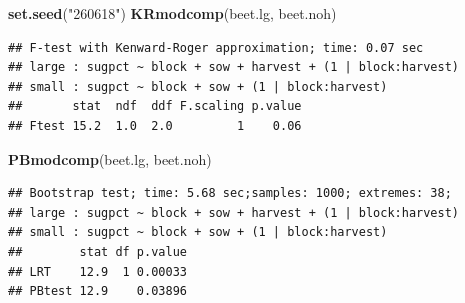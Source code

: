\documentclass[
  ignorenonframetext,
]{beamer}
\newenvironment{Shaded}{\begin{snugshade}}{\end{snugshade}}
\newcommand{\KeywordTok}[1]{\textcolor[rgb]{0.13,0.29,0.53}{\textbf{#1}}}
\newcommand{\NormalTok}[1]{#1}
\newcommand{\StringTok}[1]{\textcolor[rgb]{0.31,0.60,0.02}{#1}}
\begin{document}
\begin{frame}[fragile]

\footnotesize

\begin{Shaded}
\begin{Highlighting}[]
\KeywordTok{set.seed}\NormalTok{(}\StringTok{"260618"}\NormalTok{)}
\KeywordTok{KRmodcomp}\NormalTok{(beet.lg, beet.noh)}
\end{Highlighting}
\end{Shaded}

\begin{verbatim}
## F-test with Kenward-Roger approximation; time: 0.07 sec
## large : sugpct ~ block + sow + harvest + (1 | block:harvest)
## small : sugpct ~ block + sow + (1 | block:harvest)
##       stat  ndf  ddf F.scaling p.value
## Ftest 15.2  1.0  2.0         1    0.06
\end{verbatim}

\begin{Shaded}
\begin{Highlighting}[]
\KeywordTok{PBmodcomp}\NormalTok{(beet.lg, beet.noh)}
\end{Highlighting}
\end{Shaded}

\begin{verbatim}
## Bootstrap test; time: 5.68 sec;samples: 1000; extremes: 38;
## large : sugpct ~ block + sow + harvest + (1 | block:harvest)
## small : sugpct ~ block + sow + (1 | block:harvest)
##        stat df p.value
## LRT    12.9  1 0.00033
## PBtest 12.9    0.03896
\end{verbatim}

\normalsize

\end{frame}
\end{document}
